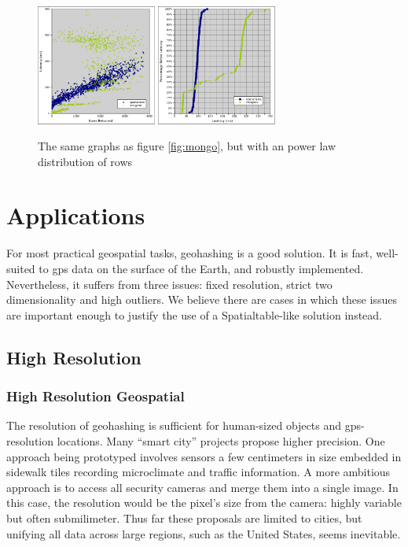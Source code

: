 \documentclass[11pt]{article}
\begin{document}
\begin{figure}[h]
\includegraphics[width=1.55in]{st_mongo_exp}
\includegraphics[width=1.55in]{st_mongo_exp_cumu}
\caption{The same graphs as figure \ref{fig:mongo}, but with an power law distribution of rows}
\label{fig:mongoexp}
\end{figure}

\section{Applications}

For most practical geospatial tasks, geohashing is a good solution.  It is fast, well-suited to gps data on the surface of the Earth, and robustly implemented.  Nevertheless, it suffers from three issues: fixed resolution, strict two dimensionality and high outliers.  We believe there are cases in which these issues are important enough to justify the use of a Spatialtable-like solution instead.

\subsection{High Resolution}

\subsubsection{High Resolution Geospatial}

The resolution of geohashing is sufficient for human-sized objects and gps-resolution locations.  Many ``smart city'' projects propose higher precision.  One approach being prototyped involves sensors a few centimeters in size embedded in sidewalk tiles recording microclimate and traffic information.\cite{nice}  A more ambitious approach is to access all security cameras and merge them into a single image.\cite{camera}  In this case, the resolution would be the pixel's size from the camera: highly variable but often submilimeter.  Thus far these proposals are limited to cities, but unifying all data across large regions, such as the United States, seems inevitable.
\end{document}
